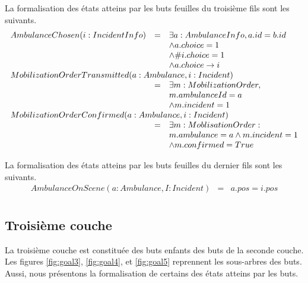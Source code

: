 	La formalisation des états atteins par les buts feuilles du troisième fils sont
	les suivants.	
	\begin{equation*}
		\begin{array}{rcl}
			AmbulanceChosen(i:IncidentInfo)  
			& = & \exists a:AmbulanceInfo, a.id = b.id  \\
			&   & \wedge a.choice = 1 \\
			&   & \wedge \#i.choice = 1 \\
			&   & \wedge a.choice \rightarrow i \\
			
			\multicolumn{3}{l}{MobilizationOrderTransmitted(a: Ambulance, i:Incident)} \\ 
			& = & \exists m: MobilizationOrder, \\
			&   & m.ambulanceId = a \\
			&   & \wedge m.incident = 1 \\
			
			\multicolumn{3}{l}{MobilizationOrderConfirmed(a:Ambulance, i:Incident)} \\ 
			& = & \exists m:MoblisationOrder: \\
			&   & m.ambulance = a \wedge m.incident = 1 \\
			&   & \wedge m.confirmed = True \\
		\end{array}
	\end{equation*}
	
	La formalisation des états atteins par les buts feuilles du dernier fils sont
	les suivants.		
	\begin{equation*}
		\begin{array}{rcl}
			AmbulanceOnScene(a:Ambulance, I:Incident)
			& = & a.pos = i.pos \\
		\end{array}
	\end{equation*}


\subsection{Troisième couche}

	La troisième couche est constituée des buts enfants
	des buts de la seconde couche. Les figures \ref{fig:goal3}, \ref{fig:goal4},
	et \ref{fig:goal5} reprennent les sous-arbres des buts. Aussi, nous
	présentons la formalisation de certains des états atteins par les
	buts.

